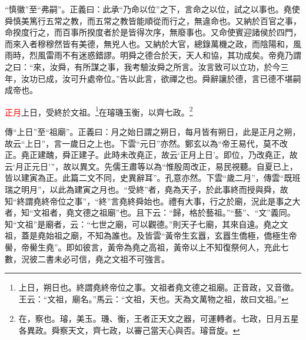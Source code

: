 {\noindent\shu{}\fzkt “慎徽”至“弗嗣”。正義曰：此承“乃命以位”之下，言命之以位，試之以事也。堯使舜慎美篤行五常之教，而五常之教皆能順從而行之，無違命也。又納於百官之事，命揆度行之，而百事所揆度者於是皆得次序，無廢事也。又命使賓迎諸侯於四門，而來入者穆穆然皆有美德，無兇人也。又納於大官，總錄萬機之政，而陰陽和，風雨時，烈風雷雨不有迷惑錯謬。明舜之德合於天，天人和協，其功成矣。帝堯乃謂之曰：“來，汝舜，有所謀之事，我考驗汝舜之所言。汝言致可以立功，於今三年，汝功已成，汝可升處帝位。”告以此言，欲禪之也。舜辭讓於德，言已德不堪嗣成帝也。 \par}

\textcolor{red}{正月}上日，受終於文祖。\footnote{上日，朔日也。終謂堯終帝位之事。文祖者堯文德之祖廟。正音政，又音徵。王云：“文祖，廟名。”馬云：“文祖，天也。天為文萬物之祖，故曰文祖。”}在璿璣玉衡，以齊七政。\footnote{在，察也。璿，美玉。璣、衡，王者正天文之器，可運轉者。七政，日月五星各異政。舜察天文，齊七政，以審己當天心與否。璿音旋。}

{\noindent\zhuan{}\fzbyks 傳“上日”至“祖廟”。正義曰：月之始日謂之朔日，每月皆有朔日，此是正月之朔，故云“上日”，言一歲日之上也。下雲“元日”亦然。鄭玄以為“帝王易代，莫不改正。堯正建醜，舜正建子。此時未改堯正，故云‘正月上日’。即位，乃改堯正，故云‘月正元日’”，故以異文。先儒王肅等以為“惟殷周改正，易民視聽。自夏已上，皆以建寅為正。此篇二文不同，史異辭耳”。孔意亦然。下雲“歲二月”，傳雲“既班瑞之明月”，以此為建寅之月也。“受終”者，堯為天子，於此事終而授與舜，故知“終謂堯終帝位之事”，“終”言堯終舜始也。禮有大事，行之於廟，況此是事之大者，知“文祖者，堯文德之祖廟”也。且下云：“歸，格於藝祖。”“藝”、“文”義同。知“文祖”是廟者，云：“七世之廟，可以觀德。”則天子七廟，其來自遠。堯之文祖，蓋是堯始祖之廟，不知為誰也。及皆雲“黃帝生玄囂，玄囂生僑極，僑極生帝嚳，帝嚳生堯”。即如彼言，黃帝為堯之高祖，黃帝以上不知復祭何人，充此七數，況彼二書未必可信，堯之文祖不可強言。 \par}

